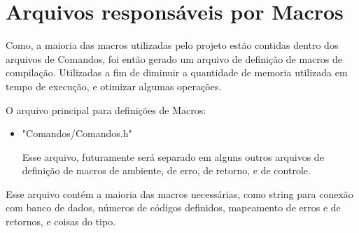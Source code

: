 \documentclass[onecolumn,12pt]{article}
\begin{document}
		\section{Arquivos responsáveis por Macros}
			Como, a maioria das macros utilizadas pelo projeto estão contidas dentro dos arquivos de Comandos, foi então gerado um arquivo de definição de macros de compilação. Utilizadas a fim de diminuir a quantidade de memoria utilizada em tempo de execução, e otimizar algumas operações.\par
			O arquivo principal para definições de Macros:
			\begin{itemize}
				\item{"Comandos/Comandos.h"}\par
					Esse arquivo, futuramente será separado em alguns outros arquivos de definição de macros de ambiente, de erro, de retorno, e de controle.\par
			\end{itemize}
			Esse arquivo contém a maioria das macros necessárias, como string para conexão com banco de dados, números de códigos definidos, mapeamento de erros e de retornos, e coisas do tipo.
\end{document}
